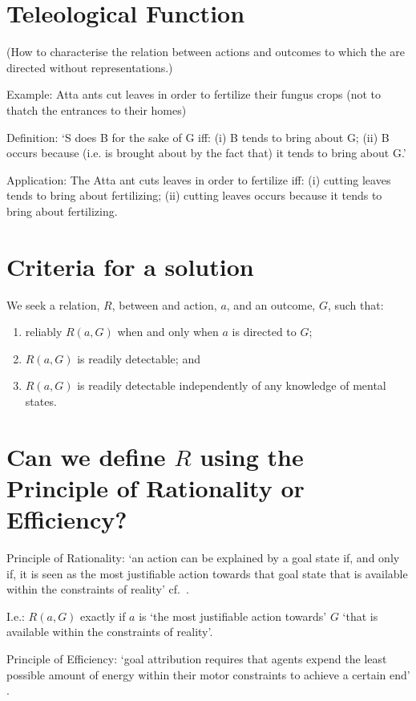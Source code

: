 \documentclass[11pt]{extarticle}
\begin{document}
\begin{multicols}{3}
\section{Teleological Function}

(How to characterise the relation between actions and outcomes to which the are directed without representations.)

Example: 
Atta ants cut leaves in order to fertilize their fungus crops (not to thatch the entrances to their homes) \citep{Schultz:1999ps}

Definition:
`S does B for the sake of G iff: (i) B tends to bring about G; (ii) B occurs because (i.e. is brought about by the fact that) it tends to bring about G.' \citep[p.\ 39]{Wright:1976ls}

Application: 
The Atta ant cuts leaves in order to fertilize iff: (i) cutting leaves tends to bring about fertilizing; (ii) cutting leaves occurs because it tends to bring about fertilizing.


\section{Criteria for a solution}
\theQuestion 
We  seek a relation, $R$, between and action, $a$, and an outcome, $G$, 
such that:
\begin{enumerate}
\item reliably $R(a,G)$ when and only when $a$ is directed to $G$; 
\item $R(a,G)$ is readily detectable; and 
\item $R(a,G)$ is readily detectable independently of any knowledge of mental states.
\end{enumerate}


\section{Can we define $R$ using the Principle of Rationality or Efficiency?}
Principle of Rationality: 
`an action can be explained by a goal state if, and only if, it is seen as the most justifiable action towards that goal state that is available within the constraints of reality' \citep[p.\ 255]{Csibra:1998cx} cf.\ \citep{Csibra:2003jv}.

I.e.: $R(a,G)$ exactly if $a$ is `the most justifiable action towards' $G$ `that is available within the constraints of reality'.

Principle of Efficiency:
`goal attribution requires that agents expend the least possible amount of energy within their motor constraints to achieve a certain end' \citep[p.\ 1061]{Southgate:2008el}.


\end{multicols}
\end{document}
